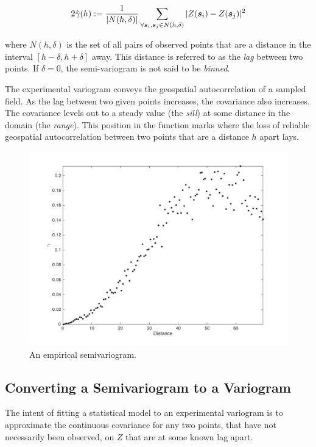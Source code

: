 \begin{equation} 
    \label{eq:exp_var}
    2\hat{\gamma}(h) := \frac{1}{|N(h,\delta)|}\sum\limits_{\forall \vect{s}_i,\vect{s}_j \in N(h, \delta)}|Z(\vect{s}_i) - Z(\vect{s}_j)|^2 %
\end{equation}

\noindent where $N(h,\delta)$ is the set of all pairs of observed points that are a distance in the interval $[h-\delta, h+\delta]$ away. This distance is referred to as the \textit{lag} between two points. If $\delta = 0$, the semi-variogram is not said to be \textit{binned}.

The experimental variogram conveys the geospatial autocorrelation of a sampled field. As the lag between two given points increases, the covariance also increases. The covariance levels out to a steady value (the \textit{sill}) at some distance in the domain (the \textit{range}). This position in the function marks where the loss of reliable geospatial autocorrelation between two points that are a distance $h$ apart lays.

\begin{figure}[ht!]
    \centering    
    \includegraphics[width=0.8\linewidth]{figures/exp_variogram.png}
    \ssp
    \caption{An empirical semivariogram.}
    \label{fig:emp_semiv}
\end{figure}

\subsection{Converting a Semivariogram to a Variogram} \label{sec:semitovar}
The intent of fitting a statistical model to an experimental variogram is to approximate the continuous covariance for any two points, that have not necessarily been observed, on $Z$ that are at some known lag apart.

